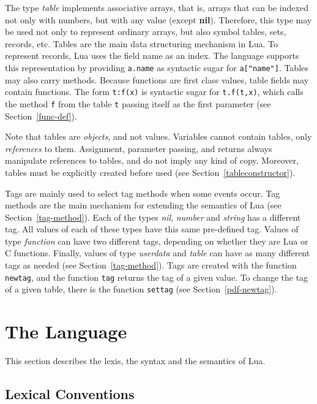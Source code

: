 \documentclass[11pt]{article}
\newcommand{\See}[1]{Section~\ref{#1}}
\newcommand{\see}[1]{(see \See{#1})}
\newcommand{\M}[1]{\emph{#1}}
\newcommand{\nil}{{\bf nil}}
\newcommand{\Index}[1]{#1\index{#1}}
\begin{document}
The type \emph{table} implements \Index{associative arrays},
that is, \Index{arrays} that can be indexed not only with numbers,
but with any value (except \nil).
Therefore, this type may be used not only to represent ordinary arrays,
but also symbol tables, sets, records, etc.
Tables are the main data structuring mechanism in Lua.
To represent \Index{records}, Lua uses the field name as an index.
The language supports this representation by
providing \verb|a.name| as syntactic sugar for \verb|a["name"]|.
Tables may also carry methods.
Because functions are first class values,
table fields may contain functions.
The form \verb|t:f(x)| is syntactic sugar for \verb|t.f(t,x)|,
which calls the method \verb|f| from the table \verb|t| passing
itself as the first parameter \see{func-def}.

Note that tables are \emph{objects}, and not values.
Variables cannot contain tables, only \emph{references} to them.
Assignment, parameter passing, and returns always manipulate references
to tables, and do not imply any kind of copy.
Moreover, tables must be explicitly created before used
\see{tableconstructor}.

Tags are mainly used to select tag methods when
some events occur.
Tag methods are the main mechanism for extending the
semantics of Lua \see{tag-method}.
Each of the types \M{nil}, \M{number} and \M{string} has a different tag.
All values of each of these types have this same pre-defined tag.
Values of type \M{function} can have two different tags,
depending on whether they are Lua or C functions.
Finally,
values of type \M{userdata} and \M{table} can have
as many different tags as needed \see{tag-method}.
Tags are created with the function \verb|newtag|,
and the function \verb|tag| returns the tag of a given value.
To change the tag of a given table,
there is the function \verb|settag| \see{pdf-newtag}.


\section{The Language}

This section describes the lexis, the syntax and the semantics of Lua.


\subsection{Lexical Conventions} \label{lexical}
\end{document}
